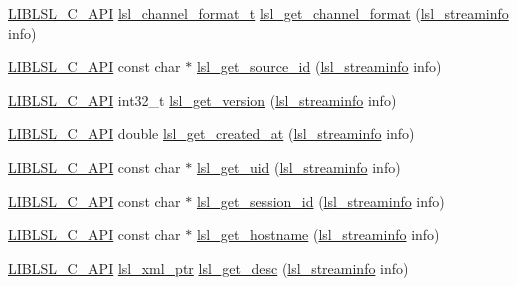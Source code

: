\begin{DoxyCompactItemize}
\item 
\hyperlink{lsl__cpp_8h_aafd0ef1813e8be84a1420c4f1df64615}{L\+I\+B\+L\+S\+L\+\_\+\+C\+\_\+\+A\+PI} \hyperlink{namespacelsl_af188e978739868560b53dbf0ddd58e66}{lsl\+\_\+channel\+\_\+format\+\_\+t} \hyperlink{namespacelsl_a70c26257a8f3042084140a85a867a300}{lsl\+\_\+get\+\_\+channel\+\_\+format} (\hyperlink{namespacelsl_aa0a9ce9956061679949daa2e35aae2e8}{lsl\+\_\+streaminfo} info)
\item 
\hyperlink{lsl__cpp_8h_aafd0ef1813e8be84a1420c4f1df64615}{L\+I\+B\+L\+S\+L\+\_\+\+C\+\_\+\+A\+PI} const char $\ast$ \hyperlink{namespacelsl_ad2987f3c32e0edae147498a8870a3215}{lsl\+\_\+get\+\_\+source\+\_\+id} (\hyperlink{namespacelsl_aa0a9ce9956061679949daa2e35aae2e8}{lsl\+\_\+streaminfo} info)
\item 
\hyperlink{lsl__cpp_8h_aafd0ef1813e8be84a1420c4f1df64615}{L\+I\+B\+L\+S\+L\+\_\+\+C\+\_\+\+A\+PI} int32\+\_\+t \hyperlink{namespacelsl_ab889dd6f9a5fc6d6cd01a0b3dc153387}{lsl\+\_\+get\+\_\+version} (\hyperlink{namespacelsl_aa0a9ce9956061679949daa2e35aae2e8}{lsl\+\_\+streaminfo} info)
\item 
\hyperlink{lsl__cpp_8h_aafd0ef1813e8be84a1420c4f1df64615}{L\+I\+B\+L\+S\+L\+\_\+\+C\+\_\+\+A\+PI} double \hyperlink{namespacelsl_aded8755dc0f65d8219449ef37ba7f6c5}{lsl\+\_\+get\+\_\+created\+\_\+at} (\hyperlink{namespacelsl_aa0a9ce9956061679949daa2e35aae2e8}{lsl\+\_\+streaminfo} info)
\item 
\hyperlink{lsl__cpp_8h_aafd0ef1813e8be84a1420c4f1df64615}{L\+I\+B\+L\+S\+L\+\_\+\+C\+\_\+\+A\+PI} const char $\ast$ \hyperlink{namespacelsl_a6e18a9b1c544932e96179a44bb1f31ec}{lsl\+\_\+get\+\_\+uid} (\hyperlink{namespacelsl_aa0a9ce9956061679949daa2e35aae2e8}{lsl\+\_\+streaminfo} info)
\item 
\hyperlink{lsl__cpp_8h_aafd0ef1813e8be84a1420c4f1df64615}{L\+I\+B\+L\+S\+L\+\_\+\+C\+\_\+\+A\+PI} const char $\ast$ \hyperlink{namespacelsl_ae28332bda70380cfd546fc158cd6f009}{lsl\+\_\+get\+\_\+session\+\_\+id} (\hyperlink{namespacelsl_aa0a9ce9956061679949daa2e35aae2e8}{lsl\+\_\+streaminfo} info)
\item 
\hyperlink{lsl__cpp_8h_aafd0ef1813e8be84a1420c4f1df64615}{L\+I\+B\+L\+S\+L\+\_\+\+C\+\_\+\+A\+PI} const char $\ast$ \hyperlink{namespacelsl_ab74235be779da7e0cdcfd59b498bdf3f}{lsl\+\_\+get\+\_\+hostname} (\hyperlink{namespacelsl_aa0a9ce9956061679949daa2e35aae2e8}{lsl\+\_\+streaminfo} info)
\item 
\hyperlink{lsl__cpp_8h_aafd0ef1813e8be84a1420c4f1df64615}{L\+I\+B\+L\+S\+L\+\_\+\+C\+\_\+\+A\+PI} \hyperlink{namespacelsl_a5edc7a49a1a1be1634fe6dce3d59c59b}{lsl\+\_\+xml\+\_\+ptr} \hyperlink{namespacelsl_aeb428e46e46db8bd534e45ed8a76a120}{lsl\+\_\+get\+\_\+desc} (\hyperlink{namespacelsl_aa0a9ce9956061679949daa2e35aae2e8}{lsl\+\_\+streaminfo} info)

\end{DoxyCompactItemize}
